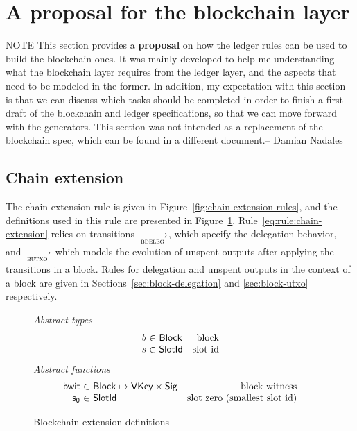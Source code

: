 \documentclass[11pt,a4paper]{article}
\newenvironment{note}
  {\begin{bclogo}[logo=\bcattention, couleur=orange!10, arrondi=0.2]{ NOTE}}
  {\end{bclogo}}
\newcommand{\var}[1]{\mathit{#1}}
\newcommand{\fun}[1]{\mathsf{#1}}
\newcommand{\type}[1]{\mathsf{#1}}
\newcommand{\trans}[2]{\xlongrightarrow[\textsc{#1}]{#2}}
\newcommand{\VKey}{\type{VKey}}
\newcommand{\Sig}{\type{Sig}}
\newcommand{\Block}{\type{Block}}
\newcommand{\SlotId}{\type{SlotId}}
\begin{document}
\section{A proposal for the blockchain layer}
\label{sec:blockchain-layer}

\begin{note}
  This section provides a \textbf{proposal} on how the ledger rules can be used
  to build the blockchain ones. It was mainly developed to help me
  understanding what the blockchain layer requires from the ledger layer, and
  the aspects that need to be modeled in the former. In addition, my
  expectation with this section is that we can discuss which tasks should be
  completed in order to finish a first draft of the blockchain and ledger
  specifications, so that we can move forward with the generators. This section
  was not intended as a replacement of the blockchain spec, which can be found
  in a different document.-- Damian Nadales
\end{note}

\subsection{Chain extension}
\label{sec:chain-extension}

The chain extension rule is given in Figure~\ref{fig:chain-extension-rules},
and the definitions used in this rule are presented in
Figure~\ref{fig:chain-extension-defs}. Rule~\ref{eq:rule:chain-extension}
relies on transitions $\trans{bdeleg}{}$, which specify the delegation
behavior, and $\trans{butxo}{}$ which models the evolution of unspent outputs
after applying the transitions in a block. Rules for delegation and unspent
outputs in the context of a block are given in
Sections~\ref{sec:block-delegation} and \ref{sec:block-utxo} respectively.

\begin{figure}
  \emph{Abstract types}
  \begin{equation*}
    \begin{array}{r@{~\in~}lr}
      \var{b} & \Block & \text{block}\\
      \var{s} & \SlotId & \text{slot id}\\
    \end{array}
  \end{equation*}
  \emph{Abstract functions}
  \begin{equation*}
    \begin{array}{r@{~\in~}lr}
    \fun{bwit} & \Block \mapsto \VKey \times \Sig & \text{block witness}\\
    \fun{s_0} & \SlotId  & \text{slot zero (smallest slot id)}\\
    \end{array}
  \end{equation*}
  \caption{Blockchain extension definitions}
  \label{fig:chain-extension-defs}
\end{figure}
\end{document}
